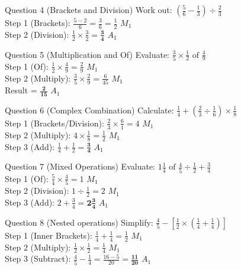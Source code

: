 \documentclass[12pt, a4paper, oneside]{article}
\begin{document}
\begin{solvingbox}{Question 4 (Brackets and Division)}
Work out: $(\frac{5}{6} - \frac{1}{3}) \div \frac{2}{3}$ \\
Step 1 (Brackets): $\frac{5 - 2}{6} = \frac{3}{6} = \frac{1}{2}$ \hfill $M_1$ \\
Step 2 (Division): $\frac{1}{2} \times \frac{3}{2} = \mathbf{\frac{3}{4}}$ \hfill $A_1$
\end{solvingbox}

\begin{solvingbox}{Question 5 (Multiplication and Of)}
Evaluate: $\frac{3}{5} \times \frac{1}{2} \text{ of } \frac{4}{9}$ \\
Step 1 (Of): $\frac{1}{2} \times \frac{4}{9} = \frac{2}{9}$ \hfill $M_1$ \\
Step 2 (Multiply): $\frac{3}{5} \times \frac{2}{9} = \frac{6}{45}$ \hfill $M_1$ \\
Result = $\mathbf{\frac{2}{15}}$ \hfill $A_1$
\end{solvingbox}

\begin{solvingbox}{Question 6 (Complex Combination)}
Calculate: $\frac{1}{4} + (\frac{2}{3} \div \frac{1}{6}) \times \frac{1}{8}$ \\
Step 1 (Brackets/Division): $\frac{2}{3} \times \frac{6}{1} = 4$ \hfill $M_1$ \\
Step 2 (Multiply): $4 \times \frac{1}{8} = \frac{1}{2}$ \hfill $M_1$ \\
Step 3 (Add): $\frac{1}{4} + \frac{1}{2} = \mathbf{\frac{3}{4}}$ \hfill $A_1$
\end{solvingbox}

\begin{solvingbox}{Question 7 (Mixed Operations)}
Evaluate: $1\frac{1}{4} \text{ of } \frac{4}{5} \div \frac{1}{2} + \frac{3}{4}$ \\
Step 1 (Of): $\frac{5}{4} \times \frac{4}{5} = 1$ \hfill $M_1$ \\
Step 2 (Division): $1 \div \frac{1}{2} = 2$ \hfill $M_1$ \\
Step 3 (Add): $2 + \frac{3}{4} = \mathbf{2\frac{3}{4}}$ \hfill $A_1$
\end{solvingbox}

\begin{solvingbox}{Question 8 (Nested operations)}
Simplify: $\frac{4}{5} - [\frac{1}{2} \times (\frac{1}{4} + \frac{1}{4})]$ \\
Step 1 (Inner Brackets): $\frac{1}{4} + \frac{1}{4} = \frac{1}{2}$ \hfill $M_1$ \\
Step 2 (Multiply): $\frac{1}{2} \times \frac{1}{2} = \frac{1}{4}$ \hfill $M_1$ \\
Step 3 (Subtract): $\frac{4}{5} - \frac{1}{4} = \frac{16 - 5}{20} = \mathbf{\frac{11}{20}}$ \hfill $A_1$
\end{solvingbox}
\end{document}
